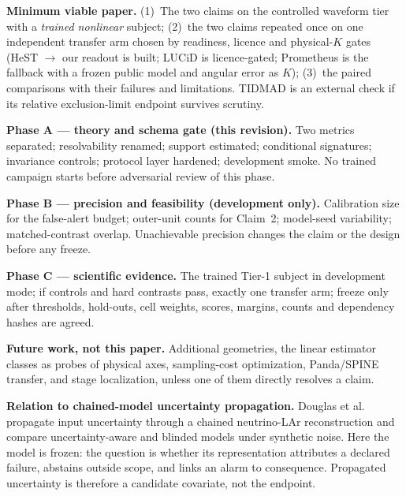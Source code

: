 \documentclass[10pt,twocolumn]{extarticle}
\begin{document}
\begin{tcolorbox}[colback=black!3,colframe=black!35,boxrule=0.4pt,
  left=4pt,right=4pt,top=3pt,bottom=3pt,arc=1pt]
\footnotesize
\textbf{Minimum viable paper.} (1)~The two claims on the controlled waveform
tier with a \emph{trained nonlinear} subject; (2)~the two claims repeated once
on one independent transfer arm chosen by readiness, licence and physical-$K$
gates (HeST $\to$ our readout is built; LUCiD is licence-gated; Prometheus is
the fallback with a frozen public model and angular error as $K$); (3)~the
paired comparisons with their failures and limitations. TIDMAD is an external
check if its relative exclusion-limit endpoint survives scrutiny.

\textbf{Phase A --- theory and schema gate (this revision).} Two metrics
separated; resolvability renamed; support estimated; conditional signatures;
invariance controls; protocol layer hardened; development smoke. No trained
campaign starts before adversarial review of this phase.

\textbf{Phase B --- precision and feasibility (development only).}
Calibration size for the false-alert budget; outer-unit counts for Claim~2;
model-seed variability; matched-contrast overlap. Unachievable precision
changes the claim or the design before any freeze.

\textbf{Phase C --- scientific evidence.} The trained Tier-1 subject in
development mode; if controls and hard contrasts pass, exactly one transfer
arm; freeze only after thresholds, hold-outs, cell weights, scores, margins,
counts and dependency hashes are agreed.

\textbf{Future work, not this paper.} Additional geometries, the linear
estimator classes as probes of physical axes, sampling-cost optimization,
Panda/SPINE transfer, and stage localization, unless one of them directly
resolves a claim.
\end{tcolorbox}

\textbf{Relation to chained-model uncertainty propagation.} Douglas et
al.~\cite{douglas2024} propagate input uncertainty through a chained
neutrino-LAr reconstruction and compare uncertainty-aware and blinded models
under synthetic noise. Here the model is frozen: the question is whether its
representation attributes a declared failure, abstains outside scope, and
links an alarm to consequence. Propagated uncertainty is therefore a candidate
covariate, not the endpoint.
\end{document}
